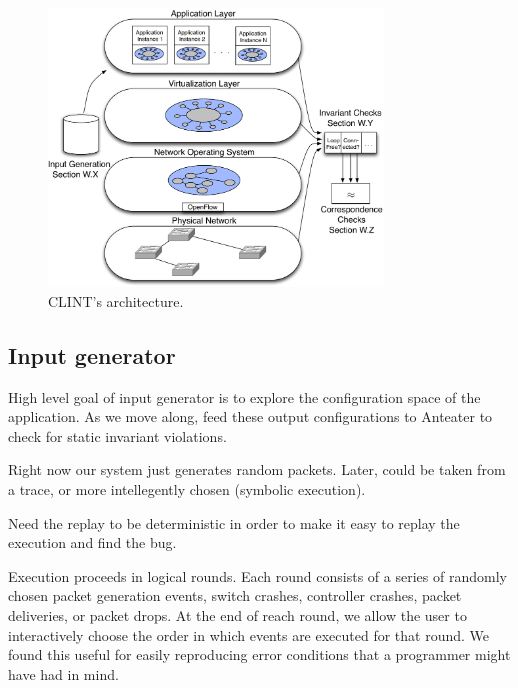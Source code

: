 
\begin{figure}[t]
    \hspace{-10pt}
    \includegraphics[width=3.5in]{../diagrams/architecture/Architecture_simplified.pdf}
    \caption[]{\label{fig:basicarch} CLINT's architecture.  \vspace{-10pt}} 
\end{figure}

\subsection{Input generator}

High level goal of input generator is to explore the configuration space of
the application. As we move along, feed these output configurations to
Anteater to check for static invariant violations.


Right now our system just generates random packets. Later, could be taken from a trace, or
more intellegently chosen (\ie symbolic execution).

Need the replay to be deterministic in order to make it easy to replay the execution
and find the bug.

Execution proceeds in logical rounds. Each round consists of a series of
randomly chosen packet generation events, switch crashes, controller crashes,
packet deliveries, or packet drops. At the end of reach round, we allow the user to
interactively choose the order in which events are executed for that round. We
found this useful for easily reproducing error conditions that a programmer
might have had in mind. 

